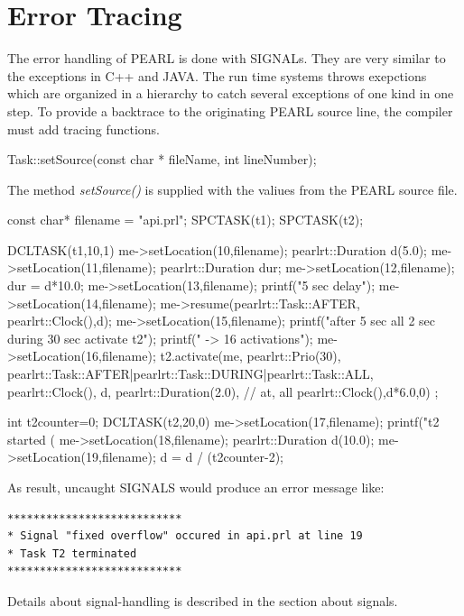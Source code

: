 \section{Error Tracing}
The error handling of PEARL is done with SIGNALs.
They are very similar to the exceptions in C++ and JAVA. 
The run time systems throws exepctions which are organized in a
hierarchy to catch several exceptions of one kind in one step.
To provide a backtrace to the originating PEARL source line, the compiler 
must add tracing functions.
\begin{CppCode}
Task::setSource(const char * fileName, int lineNumber);
\end{CppCode}
The method {\em setSource()} is supplied with the valiues from
the PEARL source file.

\begin{CppCode}
const char* filename =  "api.prl";
SPCTASK(t1);
SPCTASK(t2);

DCLTASK(t1,10,1) {
   me->setLocation(10,filename);
   pearlrt::Duration d(5.0);
   me->setLocation(11,filename);
   pearlrt::Duration dur;
   me->setLocation(12,filename);
   dur = d*10.0;
   me->setLocation(13,filename);
   printf("5 sec delay\n");
   me->setLocation(14,filename);
   me->resume(pearlrt::Task::AFTER, pearlrt::Clock(),d);
   me->setLocation(15,filename);    
   printf("after 5 sec all 2 sec during 30 sec activate  t2\n");
   printf("    -> 16 activations\n");
   me->setLocation(16,filename);
   t2.activate(me, pearlrt::Prio(30),
               pearlrt::Task::AFTER|pearlrt::Task::DURING|pearlrt::Task::ALL,
               pearlrt::Clock(), d, pearlrt::Duration(2.0), // at, all
               pearlrt::Clock(),d*6.0,0) ;    
}

int t2counter=0;
DCLTASK(t2,20,0) {
   me->setLocation(17,filename);
   printf("t2 started (%
   me->setLocation(18,filename);
   pearlrt::Duration d(10.0);
   me->setLocation(19,filename);
   d = d / (t2counter-2);
}
\end{CppCode}

As result, uncaught SIGNALS would produce an error message like:
\begin{verbatim}
***************************
* Signal "fixed overflow" occured in api.prl at line 19
* Task T2 terminated
***************************
\end{verbatim}

Details about signal-handling is described in the section about signals.

